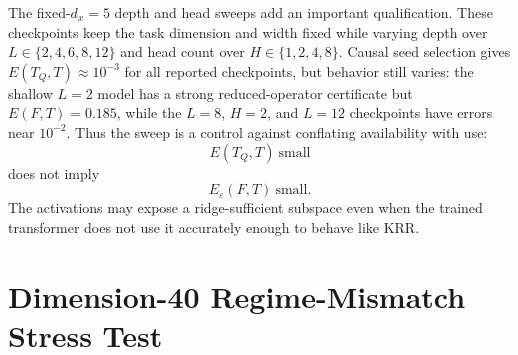 \documentclass[11pt]{article}
\begin{document}
\begin{table}[htbp]
\centering
\caption{Experiment 2 fixed-\(d_x=5\) depth/head sweep with causal seed-span selection, mean over
16 episodes. All checkpoints use width \(D=128\).}
\scriptsize
\setlength{\tabcolsep}{2.5pt}
\renewcommand{\arraystretch}{0.85}
\renewcommand{\arraystretch}{1}
\end{table}

The fixed-\(d_x=5\) depth and head sweeps add an important qualification. These checkpoints keep
the task dimension and width fixed while varying depth over \(L\in\{2,4,6,8,12\}\) and head count
over \(H\in\{1,2,4,8\}\). Causal seed selection gives \(E(T_Q,T)\approx10^{-3}\) for all reported
checkpoints, but behavior still varies: the shallow \(L=2\) model has a strong reduced-operator
certificate but
\(E(F,T)=0.185\), while the \(L=8\), \(H=2\), and \(L=12\) checkpoints have errors near \(10^{-2}\).
Thus the sweep is a control against conflating availability with use:
\[
E(T_Q,T)\ \text{small}
\]
does not imply
\[
E_\varepsilon(F,T)\ \text{small}.
\]
The activations may expose a ridge-sufficient subspace even when the trained transformer does not
use it accurately enough to behave like KRR.

\section{Dimension-40 Regime-Mismatch Stress Test}
\end{document}
